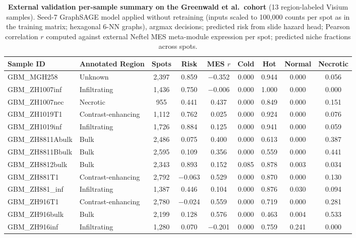 \documentclass[11pt,letterpaper]{article}
\begin{document}
\begin{table}[H]
\centering
\caption{\textbf{External validation per-sample summary on the Greenwald et al.\ cohort} (13 region-labeled Visium samples). Seed-7 GraphSAGE model applied without retraining (inputs scaled to 100{,}000 counts per spot as in the training matrix; hexagonal 6-NN graphs), argmax decisions; predicted risk from slide hazard head; Pearson correlation $r$ computed against external Neftel MES meta-module expression per spot; predicted niche fractions across spots.}
\label{tab:s2}
\footnotesize
\setlength{\tabcolsep}{4pt}
\begin{tabular}{llccccccc}
\toprule
\textbf{Sample ID} & \textbf{Annotated Region} & \textbf{Spots} & \textbf{Risk} & \textbf{MES $r$} & \textbf{Cold} & \textbf{Hot} & \textbf{Normal} & \textbf{Necrotic} \\
\midrule
GBM\_MGH258      & Unknown            & 2{,}397 & 0.859 & $-$0.352 & 0.000 & 0.944 & 0.000 & 0.056 \\
GBM\_ZH1007inf   & Infiltrating       & 1{,}436 & 0.750 & $-$0.006 & 0.000 & 1.000 & 0.000 & 0.000 \\
GBM\_ZH1007nec   & Necrotic           & 955 & 0.441 & 0.437 & 0.000 & 0.849 & 0.000 & 0.151 \\
GBM\_ZH1019T1    & Contrast-enhancing & 1{,}112 & 0.762 & 0.025 & 0.000 & 0.924 & 0.000 & 0.076 \\
GBM\_ZH1019inf   & Infiltrating       & 1{,}726 & 0.884 & 0.125 & 0.000 & 0.941 & 0.000 & 0.059 \\
GBM\_ZH8811Abulk & Bulk               & 2{,}486 & 0.075 & 0.400 & 0.000 & 0.613 & 0.000 & 0.387 \\
GBM\_ZH8811Bbulk & Bulk               & 2{,}595 & 0.109 & 0.356 & 0.000 & 0.559 & 0.000 & 0.441 \\
GBM\_ZH8812bulk  & Bulk               & 2{,}343 & 0.893 & 0.152 & 0.085 & 0.878 & 0.003 & 0.034 \\
GBM\_ZH881T1     & Contrast-enhancing & 2{,}792 & $-$0.063 & 0.529 & 0.000 & 0.870 & 0.000 & 0.130 \\
GBM\_ZH881\_inf  & Infiltrating       & 1{,}387 & 0.446 & 0.104 & 0.000 & 0.876 & 0.030 & 0.094 \\
GBM\_ZH916T1     & Contrast-enhancing & 2{,}780 & $-$0.024 & 0.559 & 0.000 & 0.719 & 0.000 & 0.281 \\
GBM\_ZH916bulk   & Bulk               & 2{,}199 & 0.128 & 0.576 & 0.000 & 0.463 & 0.004 & 0.533 \\
GBM\_ZH916inf    & Infiltrating       & 1{,}280 & 0.070 & $-$0.201 & 0.000 & 0.759 & 0.241 & 0.000 \\
\bottomrule
\end{tabular}
\end{table}
\end{document}

